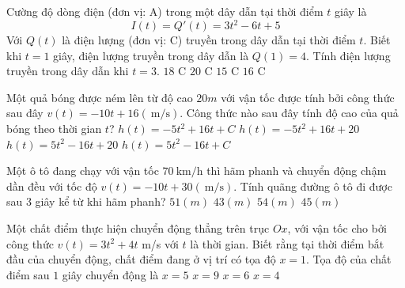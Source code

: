 \begin{ex}
	Cường độ dòng điện (đơn vị: A) trong một dây dẫn tại thời điểm $t$ giây là
	$$I(t)=Q'(t)=3t^2-6t+5$$
	Với $Q(t)$ là điện lượng (đơn vị: C) truyền trong dây dẫn tại thời điểm $t$. Biết khi $t=1$ giây, điện lượng truyền trong dây dẫn là $Q(1)=4$. Tính điện lượng truyền trong dây dẫn khi $t=3$.
	\choice
	{$18$ C}
	{$20$ C}
	{$15$ C}
	{\True $16$ C}
\end{ex}

\begin{ex}
	Một quả bóng được ném lên từ độ cao $20 m$ với vận tốc được tính bởi công thức sau đây $v(t)=-10 t+16(\mathrm{~m} / \mathrm{s})$. Công thức nào sau đây tính độ cao của quả bóng theo thời gian $t$?
	\choice
	{$h(t)=-5 t^2+16 t+C$}
	{\True $h(t)=-5 t^2+16 t+20$}
	{$h(t)=5 t^2-16 t+20$}
	{$h(t)=5 t^2-16 t+C$}
\end{ex}
\begin{ex}
	Một ô tô đang chạy với vận tốc $70 \mathrm{~km} / \mathrm{h}$ thì hãm phanh và chuyển động chậm dần đều với tốc độ $v(t)=-10 t+30(\mathrm{~m} / \mathrm{s})$. Tính quãng đường ô tô đi được sau 3 giây kể từ khi hãm phanh?
	\choice
	{$51(m)$}
	{$43(m)$}
	{$54(m)$}
	{\True $45(m)$}
\end{ex}
\begin{ex}
	Một chất điểm thực hiện chuyển động thẳng trên trục $Ox$, với vận tốc cho bởi công thức $v(t)=3t^2+4t$ m/s với $t$ là thời gian. Biết rằng tại thời điểm bắt đầu của chuyển động, chất điểm đang ở vị trí có tọa độ $x=1$. Tọa độ của chất điểm sau $1$ giây chuyển động là
	\choice
	{$x=5$}
	{$x=9$}
	{$x=6$}
	{\True $x=4$}
\end{ex}

